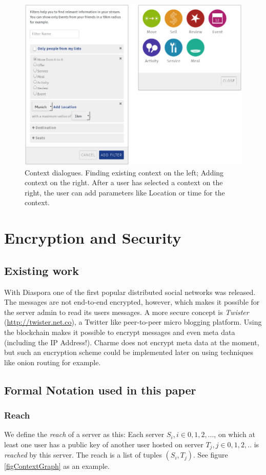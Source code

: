 \documentclass{scrartcl}
\begin{document}
\begin{figure}[ht]
	\centering
  \includegraphics[width=120mm]{illustrations/context.jpg}
	\caption{Context dialogues. Finding existing context on the left; Adding context on the right. After a user has selected a context on the right, the user can add parameters like Location or time for the context.}
	\label{figContext}
\end{figure}



 \section{Encryption and Security}
 \subsection{Existing work}
With Diaspora one of the first popular distributed social networks was released. The messages are not end-to-end encrypted, however, which makes it possible for the server admin to read its users messages. 
A more secure concept is \textit{Twister} (\url{http://twister.net.co}), a Twitter like peer-to-peer micro blogging platform. Using the blockchain makes it possible to encrypt messages and even meta data (including the IP Address!). Charme does not encrypt meta data at the moment, but such an encryption scheme could be implemented later on using techniques like onion routing for example.
\subsection{Formal Notation used in this paper}
\subsubsection{Reach}
 We define the \textit{reach} of a server as this: Each server $S_i, i \in {0,1,2,...}$, on which at least one user has a public key of another user hosted on server $T_j, j \in {0,1,2,..}$ is \textit{reached} by this server.
The reach is a list of tuples $(S_i, T_j)$. See figure \ref{figContextGraph} as an example.
\end{document}
